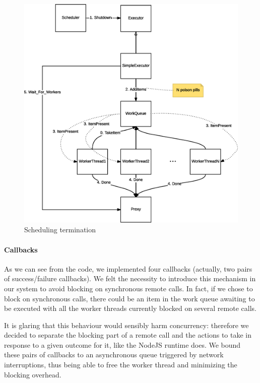 \begin{figure}[H]
\centering
\includegraphics[scale=0.5,keepaspectratio]{images/solution/app/backend/scheduling-termination.eps}
\caption{Scheduling termination}
\label{fig:schedule-termination}
\end{figure}

\paragraph{Callbacks}

As we can see from the code, we implemented four callbacks (actually, two
pairs of success/failure callbacks).
We felt the necessity to introduce this mechanism in our system to avoid
blocking on synchronous remote calls.
In fact, if we chose to block on synchronous calls, there could be an item in
the work queue awaiting to be executed with all the worker threads currently
blocked on several remote calls.

It is glaring that this behaviour would sensibly harm concurrency: therefore we
decided to separate the blocking part of a remote call and the actions to take
in response to a given outcome for it, like the NodeJS runtime does.
We bound these pairs of callbacks to an asynchronous queue triggered by network
interruptions, thus being able to free the worker thread and minimizing the
blocking overhead.
